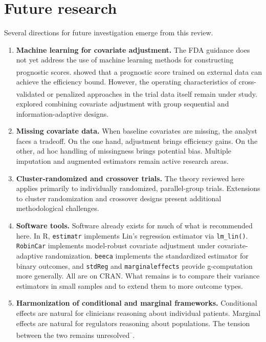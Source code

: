 \documentclass[
  11pt,
]{article}
\begin{document}
\section{Future research}\label{future-research}

Several directions for future investigation emerge from
this review.

\begin{enumerate}
\def\labelenumi{\arabic{enumi}.}
\item
  \textbf{Machine learning for covariate adjustment.} The
  FDA guidance does not yet address the use of machine
  learning methods for constructing prognostic scores.\textsuperscript{} showed that a prognostic score
  trained on external data can achieve the efficiency
  bound. However, the operating characteristics of
  cross-validated or penalized approaches in the trial
  data itself remain under study.\textsuperscript{} explored combining
  covariate adjustment with group sequential and
  information-adaptive designs.
\item
  \textbf{Missing covariate data.} When baseline covariates
  are missing, the analyst faces a tradeoff. On the one
  hand, adjustment brings efficiency gains. On the
  other, ad hoc handling of missingness brings potential
  bias. Multiple
  imputation and augmented estimators remain active
  research areas.
\item
  \textbf{Cluster-randomized and crossover trials.} The
  theory reviewed here applies primarily to
  individually randomized, parallel-group trials.
  Extensions to cluster randomization and crossover
  designs present additional methodological challenges.
\item
  \textbf{Software tools.} Software already exists for
  much of what is recommended here. In R, \texttt{estimatr}
  implements Lin's regression estimator via
  \texttt{lm\_lin()}. \texttt{RobinCar} implements model-robust
  covariate adjustment under covariate-adaptive
  randomization. \texttt{beeca} implements the standardized
  estimator for binary outcomes, and \texttt{stdReg} and
  \texttt{marginaleffects} provide g-computation more
  generally. All are on CRAN. What remains is to
  compare their variance estimators in small samples
  and to extend them to more outcome types.
\item
  \textbf{Harmonization of conditional and marginal
  frameworks.} Conditional effects are natural for
  clinicians reasoning about individual patients.
  Marginal effects are natural for regulators reasoning
  about populations. The tension between the two remains
  unresolved\textsuperscript{--}.
\end{enumerate}
\end{document}
